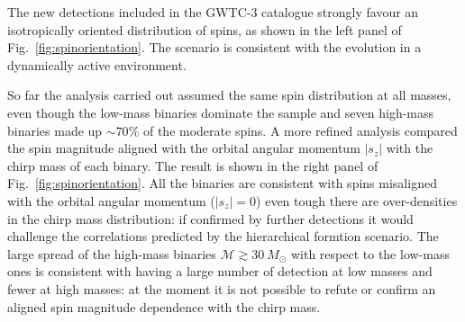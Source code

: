 \documentclass[a4paper,titlepage]{book}     	%
\newcommand{\sun}{\ensuremath{_\odot}}
\newcommand{\msun}{\ensuremath{M\sun}}
\begin{document}
The new detections included in the GWTC-3 catalogue strongly favour an isotropically oriented distribution of spins, as shown in the left panel of Fig.\ \ref{fig:spinorientation}. The scenario is consistent with the evolution in a dynamically active environment.

So far the analysis carried out assumed the same spin distribution at all masses, even though the low-mass binaries dominate the sample and seven high-mass binaries made up $\sim 70 \%$ of the moderate spins. A more refined analysis compared the spin magnitude aligned with the orbital angular momentum $|s_z|$ with the chirp mass of each binary. The result is shown in the right panel of Fig.\ \ref{fig:spinorientation}. All the binaries are consistent with spins misaligned with the orbital angular momentum ($|s_z| = 0$) even tough there are over-densities in the chirp mass distribution: if confirmed by further detections it would challenge the correlations predicted by the hierarchical formtion scenario. The large spread of the high-mass binaries $\mathcal{M} \gtrsim 30~\msun$ with respect to the low-mass ones is consistent with having a large number of detection at low masses and fewer at high masses: at the moment it is not possible to refute or confirm an aligned spin magnitude dependence with the chirp mass.
\end{document}
